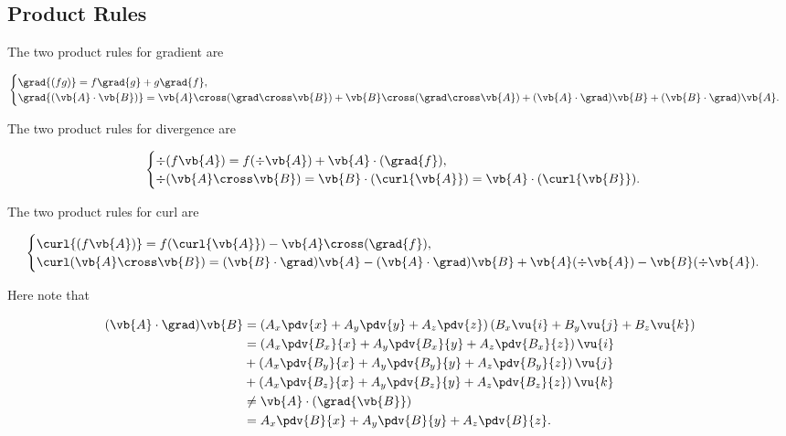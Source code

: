 \documentclass[english,a4paper,12pt]{report}
\begin{document}
\subsection{Product Rules}
The two product rules for gradient are

\begin{equation}
\begin{cases} 
	\grad{(fg)} = f\grad{g} + g\grad{f},  \\
	\grad{(\vb{A} \cdot \vb{B})} = \vb{A} \cross (\grad \cross \vb{B}) + \vb{B} \cross (\grad \cross \vb{A}) + (\vb{A} \cdot \grad)\vb{B} + (\vb{B} \cdot \grad)\vb{A}. 
\end{cases}
\end{equation}
	
The two product rules for divergence are 

\begin{equation}
\begin{cases} 
	\div{(f\vb{A})} = f(\div{\vb{A}}) + \vb{A} \cdot (\grad{f}), \\
	\div (\vb{A} \cross \vb{B}) = \vb{B} \cdot (\curl {\vb{A}}) = \vb{A} \cdot (\curl{\vb{B}}). 
\end{cases}
\end{equation}

	
The two product rules for curl are
	
\begin{equation}
\begin{cases} 
	\curl{(f\vb{A})} = f(\curl{\vb{A}}) - \vb{A} \cross (\grad{f}), \\
	\curl (\vb{A} \cross \vb{B}) = (\vb{B} \cdot \grad)\vb{A} - (\vb{A} \cdot \grad)\vb{B} + \vb{A}(\div{\vb{A}}) - \vb{B}(\div{\vb{A}}). 
\end{cases}
\end{equation}

	
Here note that

\begin{equation} 
	\begin{aligned} 
		(\vb{A} \cdot \grad) \vb{B} &= \left(A_x\pdv{x} + A_y\pdv{y} + A_z\pdv{z}\right)\left(B_x\vu{i} + B_y\vu{j} + B_z\vu{k}\right) \\ &= \left(A_x\pdv{B_x}{x} + A_y\pdv{B_x}{y} + A_z\pdv{B_x}{z}\right)\vu{i} \\ &+ \left(A_x\pdv{B_y}{x} + A_y\pdv{B_y}{y} + A_z\pdv{B_y}{z}\right)\vu{j} \\ &+ \left(A_x\pdv{B_z}{x} + A_y\pdv{B_z}{y} + A_z\pdv{B_z}{z}\right)\vu{k} \\ &\neq \vb{A} \cdot (\grad{\vb{B}}) \\ &= A_x\pdv{B}{x} + A_y\pdv{B}{y} + A_z\pdv{B}{z} .
	\end{aligned} 
\end{equation}
	
\end{document}
